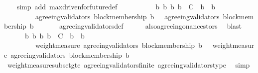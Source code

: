 \begin{isabellebody}
\ \ %
\endisadelimproof
%
\isatagproof
{}\isamarkupfalse%
\ {\isacharparenleft}simp\ add{\isacharcolon}\ max{\isacharunderscore}driven{\isacharunderscore}for{\isacharunderscore}future{\isacharunderscore}def{\isacharparenright}\isanewline
{}\isamarkupfalse%
\ {\isacharminus}\isanewline
\ \ \isamarkupfalse%
\ {\isachardoublequoteopen}{\isasymforall}\ {\isasymsigma}\ {\isasymin}\ {\isasymSigma}{\isachardot}\ {\isasymforall}\ b\ b{\isacharprime}{\isachardot}\ {\isacharbraceleft}b{\isacharcomma}\ b{\isacharprime}{\isacharbraceright}\ {\isasymsubseteq}\ C\ {\isasymand}\ b{\isacharprime}\ {\isasymdownharpoonright}\ b\isanewline
\ \ \ \ \ \ \ \ {\isasymlongrightarrow}\ agreeing{\isacharunderscore}validators\ {\isacharparenleft}block{\isacharunderscore}membership\ b{\isacharcomma}\ {\isasymsigma}{\isacharparenright}\ {\isasymsubseteq}\ agreeing{\isacharunderscore}validators\ {\isacharparenleft}block{\isacharunderscore}membership\ b{\isacharprime}{\isacharcomma}\ {\isasymsigma}{\isacharparenright}{\isachardoublequoteclose}\isanewline
\ \ \ \ \isamarkupfalse%
\ agreeing{\isacharunderscore}validators{\isacharunderscore}def\isanewline
\ \ \ \ \isamarkupfalse%
\ also{\isacharunderscore}agreeing{\isacharunderscore}on{\isacharunderscore}ancestors\ \isamarkupfalse%
\ blast\isanewline
\ \ \isamarkupfalse%
\ {\isachardoublequoteopen}{\isasymforall}\ {\isasymsigma}\ {\isasymin}\ {\isasymSigma}{\isachardot}\ {\isasymforall}\ b\ b{\isacharprime}{\isachardot}\ {\isacharbraceleft}b{\isacharcomma}\ b{\isacharprime}{\isacharbraceright}\ {\isasymsubseteq}\ C\ {\isasymand}\ b{\isacharprime}\ {\isasymdownharpoonright}\ b\ \isanewline
\ \ \ \ \ \ \ \ {\isasymlongrightarrow}\ weight{\isacharunderscore}measure\ {\isacharparenleft}agreeing{\isacharunderscore}validators\ {\isacharparenleft}block{\isacharunderscore}membership\ b{\isacharprime}{\isacharcomma}\ {\isasymsigma}{\isacharparenright}{\isacharparenright}\ {\isasymge}\ weight{\isacharunderscore}measure\ {\isacharparenleft}agreeing{\isacharunderscore}validators\ {\isacharparenleft}block{\isacharunderscore}membership\ b{\isacharcomma}\ {\isasymsigma}{\isacharparenright}{\isacharparenright}{\isachardoublequoteclose}\isanewline
\ \ \ \ \isamarkupfalse%
\ weight{\isacharunderscore}measure{\isacharunderscore}subset{\isacharunderscore}gte\ agreeing{\isacharunderscore}validators{\isacharunderscore}finite\ agreeing{\isacharunderscore}validators{\isacharunderscore}type\ \isamarkupfalse%
\ simp\isanewline

\end{isabellebody}
